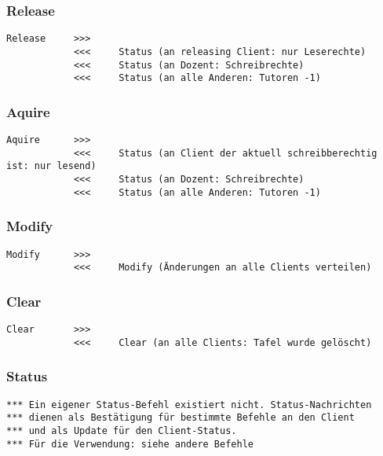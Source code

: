 \subsubsection{Release}
\begin{lstlisting}
Release     >>>
            <<<     Status (an releasing Client: nur Leserechte)
            <<<     Status (an Dozent: Schreibrechte)
            <<<     Status (an alle Anderen: Tutoren -1)
\end{lstlisting}

\subsubsection{Aquire}
\begin{lstlisting}
Aquire      >>>
            <<<     Status (an Client der aktuell schreibberechtig ist: nur lesend)
            <<<     Status (an Dozent: Schreibrechte)
            <<<     Status (an alle Anderen: Tutoren -1)
\end{lstlisting}

\subsubsection{Modify}
\begin{lstlisting}
Modify      >>>
            <<<     Modify (Änderungen an alle Clients verteilen)
\end{lstlisting}

\subsubsection{Clear}
\begin{lstlisting}
Clear       >>>
            <<<     Clear (an alle Clients: Tafel wurde gelöscht)
\end{lstlisting}

\subsubsection{Status}
\begin{lstlisting}
*** Ein eigener Status-Befehl existiert nicht. Status-Nachrichten
*** dienen als Bestätigung für bestimmte Befehle an den Client
*** und als Update für den Client-Status.
*** Für die Verwendung: siehe andere Befehle
\end{lstlisting}

